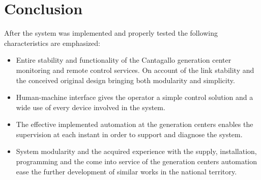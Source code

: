 
\section{Conclusion}

After the system was implemented and properly tested the following characteristics are emphasized:

\begin{itemize}
\item Entire stability and functionality of the Cantagallo generation
  center monitoring and remote control services. On account of the
  link stability and the conceived original design bringing both
  modularity and simplicity.
\item Human-machine interface gives the operator a simple control
  solution and a wide use of every device involved in the system.
\item The effective implemented automation at the generation centers
  enables the supervision at each instant in order to support and
  diagnose the system.
\item System modularity and the acquired experience with the supply,
  installation, programming and the come into service of the generation
  centers automation ease the further development of similar works in
  the national territory.
\end{itemize}
